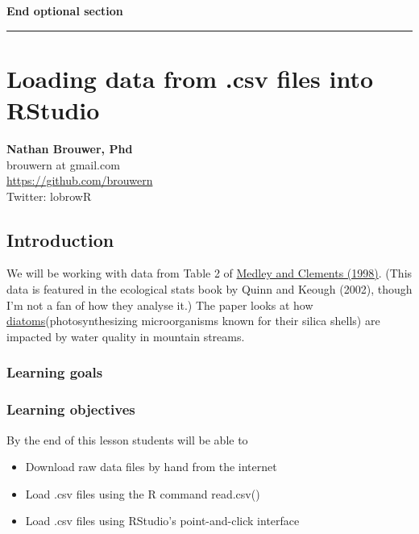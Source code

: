 \documentclass[]{book}
\providecommand{\tightlist}{%
  \setlength{\itemsep}{0pt}\setlength{\parskip}{0pt}}
\theoremstyle{definition}
\theoremstyle{definition}
\theoremstyle{definition}
\theoremstyle{remark}
\begin{document}
\textbf{End optional section}

\begin{center}\rule{0.5\linewidth}{\linethickness}\end{center}

\chapter{Loading data from .csv files into
RStudio}\label{loading-data-from-.csv-files-into-rstudio}

\textbf{Nathan Brouwer, Phd}\\
brouwern at gmail.com\\
\url{https://github.com/brouwern}\\
Twitter: lobrowR

\section{Introduction}\label{introduction-4}

We will be working with data from Table 2 of
\href{https://www.jstor.org/stable/2641255}{Medley and Clements (1998)}.
(This data is featured in the ecological stats book by Quinn and Keough
(2002), though I'm not a fan of how they analyse it.) The paper looks at
how
\href{https://en.wikipedia.org/wiki/Diatom}{diatoms}(photosynthesizing
microorganisms known for their silica shells) are impacted by water
quality in mountain streams.

\subsection{Learning goals}\label{learning-goals-2}

\subsection{Learning objectives}\label{learning-objectives-2}

By the end of this lesson students will be able to

\begin{itemize}
\tightlist
\item
  Download raw data files by hand from the internet
\item
  Load .csv files using the R command read.csv()
\item
  Load .csv files using RStudio's point-and-click interface
\end{itemize}
\end{document}
